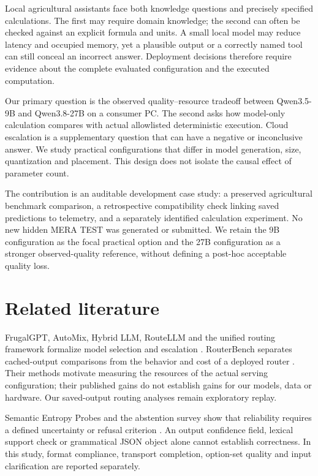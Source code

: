 \documentclass[10pt,a4paper]{article}
\begin{document}
Local agricultural assistants face both knowledge questions and precisely specified calculations. The first may require domain knowledge; the second can often be checked against an explicit formula and units. A small local model may reduce latency and occupied memory, yet a plausible output or a correctly named tool can still conceal an incorrect answer. Deployment decisions therefore require evidence about the complete evaluated configuration and the executed computation.


Our primary question is the observed quality--resource tradeoff between Qwen3.5-9B and Qwen3.8-27B on a consumer PC. The second asks how model-only calculation compares with actual allowlisted deterministic execution. Cloud escalation is a supplementary question that can have a negative or inconclusive answer. We study practical configurations that differ in model generation, size, quantization and placement. This design does not isolate the causal effect of parameter count.


The contribution is an auditable development case study: a preserved agricultural benchmark comparison, a retrospective compatibility check linking saved predictions to telemetry, and a separately identified calculation experiment. No new hidden MERA TEST was generated or submitted. We retain the 9B configuration as the focal practical option and the 27B configuration as a stronger observed-quality reference, without defining a post-hoc acceptable quality loss.


\section{Related literature}

FrugalGPT, AutoMix, Hybrid LLM, RouteLLM and the unified routing framework formalize model selection and escalation \cite{ref1,ref2,ref3,ref4,ref5}. RouterBench separates cached-output comparisons from the behavior and cost of a deployed router \cite{ref6}. Their methods motivate measuring the resources of the actual serving configuration; their published gains do not establish gains for our models, data or hardware. Our saved-output routing analyses remain exploratory replay.


Semantic Entropy Probes and the abstention survey show that reliability requires a defined uncertainty or refusal criterion \cite{ref7,ref8}. An output confidence field, lexical support check or grammatical JSON object alone cannot establish correctness. In this study, format compliance, transport completion, option-set quality and input clarification are reported separately.
\end{document}
